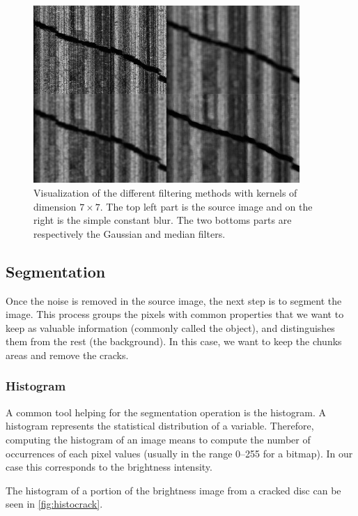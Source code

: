 \begin{figure}[!ht]
\centering
\includegraphics[width=0.9\textwidth]{images/filter-methods}
\caption[Visualization of the different filtering methods.]
{Visualization of the different filtering methods with kernels of dimension $7 \times 7$. The top left part is the source image and on the right is the simple constant blur. The two bottoms parts are respectively the Gaussian and median filters.}
\label{fig:filtermeth}
\end{figure}

\subsection{Segmentation}

Once the noise is removed in the source image, the next step is to segment the image. This process groups the pixels with common properties that we want to keep as valuable information (commonly called the object), and distinguishes them from the rest (the background). In this case, we want to keep the chunks areas and remove the cracks.

\subsubsection{Histogram}

A common tool helping for the segmentation operation is the histogram. A histogram represents the statistical distribution of a variable. Therefore, computing the histogram of an image means to compute the number of occurrences of each pixel values (usually in the range \numrange[range-phrase=--]{0}{255} for a bitmap). In our case this corresponds to the brightness intensity.

The histogram of a portion of the brightness image from a cracked disc can be seen in \autoref{fig:histocrack}.

